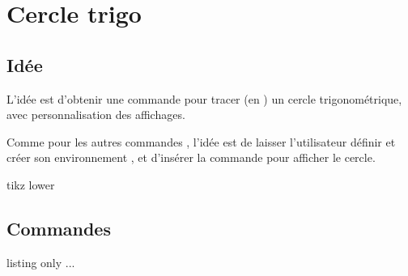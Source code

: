 \newpage

\section{Cercle trigo}\label{cercletrigo}

\subsection{Idée}

\begin{tipblock}
L'idée est d'obtenir une commande pour tracer (en \TikZ) un cercle trigonométrique, avec personnalisation des affichages.

\smallskip

Comme pour les autres commandes \TikZ, l'idée est de laisser l'utilisateur définir et créer son environnement \TikZ, et d'insérer la commande  pour afficher le cercle.
\end{tipblock}

\begin{PresCodePL}{tikz lower}
\CercleTrigo
\end{PresCodePL}

\subsection{Commandes}

\begin{PresCodeTexPL}{listing only}
...
\end{PresCodeTexPL}

